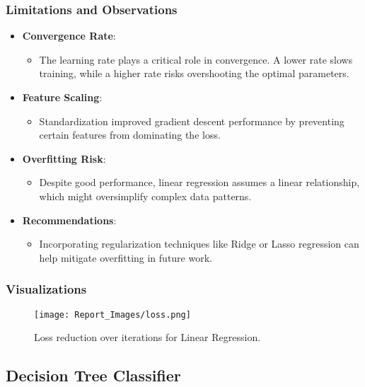 \documentclass[12pt]{article}
\begin{document}
\subsubsection{Limitations and Observations}

\begin{itemize}
    \item \textbf{Convergence Rate}:
    \begin{itemize}
        \item The learning rate plays a critical role in convergence. A lower rate slows training, while a higher rate risks overshooting the optimal parameters.
    \end{itemize}

    \item \textbf{Feature Scaling}:
    \begin{itemize}
        \item Standardization improved gradient descent performance by preventing certain features from dominating the loss.
    \end{itemize}

    \item \textbf{Overfitting Risk}:
    \begin{itemize}
        \item Despite good performance, linear regression assumes a linear relationship, which might oversimplify complex data patterns.
    \end{itemize}

    \item \textbf{Recommendations}:
    \begin{itemize}
        \item Incorporating regularization techniques like Ridge or Lasso regression can help mitigate overfitting in future work.
    \end{itemize}
\end{itemize}

\subsubsection{Visualizations}

\begin{figure}[h!]
\centering
\texttt{[image: Report\_Images/loss.png]}
\caption{Loss reduction over iterations for Linear Regression.}
\label{fig:loss_plot}
\end{figure}



\subsection{Decision Tree Classifier}
\end{document}
